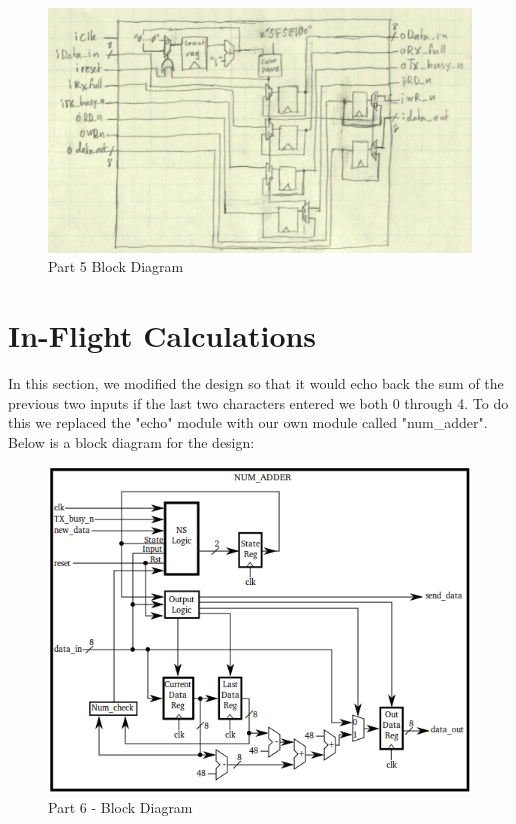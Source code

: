 \documentclass{article}
\begin{document}
	\begin{figure}[h]
		\begin{center}
			\includegraphics[scale=0.6]{../part5_files/part5_block_diagram.png}
			\caption{Part 5 Block Diagram}
		\end{center}
	\end{figure}


\pagebreak


\section{In-Flight Calculations}
In this section, we modified the design so that it would echo back the sum of the previous two inputs if the last two characters entered we both 0 through 4. To do this we replaced the "echo" module with our own module called "num\_adder". Below is a block diagram for the design: \\


	\begin{figure}[h]
		\begin{center}
			\includegraphics[scale=0.55]{../block_diagrams/part_6_block_diagram_num_adder.png}
			\caption{Part 6 - Block Diagram}
		\end{center}
	\end{figure}
\end{document}
